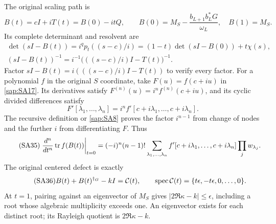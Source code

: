 \documentclass[11pt]{article}
\begin{document}
The original scaling path is
\begin{equation}\tag{SA32}\label{sap:SA32}
B(t)=cI+iT(t)=B(0)-itQ,\qquad
B(0)=M_S-\frac{b_{L+1}b_L^*G}{\omega_L},\quad
B(1)=M_S.
\end{equation}
Its complete determinant and resolvent are
\begin{equation}\tag{SA33}\label{sap:SA33}
\begin{gathered}
\det(sI-B(t))=i^qp_t((s-c)/i)
=(1-t)\det(sI-B(0))+t\chi(s),\\
(sI-B(t))^{-1}
=i^{-1}\big(((s-c)/i)I-T(t)\big)^{-1}.
\end{gathered}
\end{equation}
Factor $sI-B(t)=i(((s-c)/i)I-T(t))$ to verify every
factor. For a polynomial $f$ in the original $S$
coordinate, take $F(u)=f(c+iu)$ in \eqref{sap:SA17}.
Its derivatives satisfy $F^{(n)}(u)=i^nf^{(n)}(c+iu)$,
and its cyclic divided differences satisfy
\begin{equation}\tag{SA34}\label{sap:SA34}
F'[\lambda_1,\ldots,\lambda_n]
=i^n f'[c+i\lambda_1,\ldots,c+i\lambda_n].
\end{equation}
The recursive definition or \eqref{sap:SA8} proves the
factor $i^{n-1}$ from change of nodes and the further
$i$ from differentiating $F$. Thus
\begin{equation}\tag{SA35}\label{sap:SA35}
\left.\frac{d^n}{dt^n}\operatorname{tr} f(B(t))\right|_{t=0}
=(-i)^n(n-1)!
\sum_{\lambda_1,\ldots,\lambda_n}
f'[c+i\lambda_1,\ldots,c+i\lambda_n]\prod_jw_{\lambda_j}.
\end{equation}
The original centered defect is exactly
\begin{equation}\tag{SA36}\label{sap:SA36}
B(t)+B(t)^{\dagger_G}-kI
=\mathcal C(t),\qquad
\operatorname{spec}\mathcal C(t)
=\{t\epsilon,-t\epsilon,0,\ldots,0\}.
\end{equation}
At $t=1$, pairing against an eigenvector of $M_S$
gives $|2\Re\kappa-k|\leq\epsilon$, including a root
whose algebraic multiplicity exceeds one. An
eigenvector exists for each distinct root; its
Rayleigh quotient is $2\Re\kappa-k$.
\end{document}
